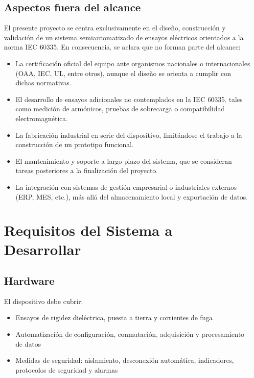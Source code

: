 \documentclass[a4paper,12pt]{article}
\begin{document}
\subsection{Aspectos fuera del alcance}

El presente proyecto se centra exclusivamente en el diseño, construcción y validación de un sistema semiautomatizado de ensayos eléctricos orientados a la norma IEC 60335. En consecuencia, se aclara que no forman parte del alcance:

\begin{itemize}
    \item La certificación oficial del equipo ante organismos nacionales o internacionales (OAA, IEC, UL, entre otros), aunque el diseño se orienta a cumplir con dichas normativas.
    \item El desarrollo de ensayos adicionales no contemplados en la IEC 60335, tales como medición de armónicos, pruebas de sobrecarga o compatibilidad electromagnética.
    \item La fabricación industrial en serie del dispositivo, limitándose el trabajo a la construcción de un prototipo funcional.
    \item El mantenimiento y soporte a largo plazo del sistema, que se consideran tareas posteriores a la finalización del proyecto.
    \item La integración con sistemas de gestión empresarial o industriales externos (ERP, MES, etc.), más allá del almacenamiento local y exportación de datos.
\end{itemize}


\section{Requisitos del Sistema a Desarrollar}
\subsection{Hardware}
El dispositivo debe cubrir:
\begin{itemize}
    \item Ensayos de rigidez dieléctrica, puesta a tierra y corrientes de fuga
    \item Automatización de configuración, conmutación, adquisición y procesamiento de
datos
    \item Medidas de seguridad: aislamiento, desconexión automática, indicadores, protocolos de seguridad y alarmas
\end{itemize}
\end{document}
